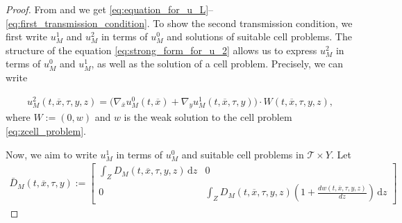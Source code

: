\documentclass[11pt]{article}
\def\T{\mathcal{T}}
\newcommand{\di}[1]{\,\mathrm{d}#1}
\begin{document}
\begin{proof} 
   From  and  we get \eqref{eq:equation_for_u_L}--\eqref{eq:first_transmission_condition}. To show the second transmission condition, we first write $u_M^1$ and $u_M^2$ in terms of $u_M^0$ and solutions of suitable cell problems.
 The structure of the equation \eqref{eq:strong_form_for_u_2} allows us to express $u_M^2$ in terms of $ u_M^0$ and $ u_M^1$, as well as the solution of a cell problem. Precisely, we can write
 
\begin{align*}   u_M^2(t,\overline{x},\tau,y,z)=\Big(\nabla_{\overline{x}}u_M^0(t,\overline{x})+\nabla_y u_M^1(t,\overline{x},\tau,y)\Big)\cdot W(t,\overline{x},\tau,y,z),
\end{align*}
where $W:=(0,w)$ and $w$ is the weak solution to the cell problem \eqref{eq:zcell_problem}.
   
   
   Now, we aim to write $u_M^1$ in terms of $u_M^0$ and suitable cell problems in $\T\times Y$. Let 
 \begin{align}\label{eq:DMbar_structuer2}
        \bar D_M(t,\overline{x},\tau,y):=\begin{bmatrix}
            \int_Z D_M(t,\overline{x},\tau,y,z)\di{z}&0\\
            0&\int_Z D_M(t,\overline{x},\tau,y,z)\left(1+\frac{dw(t,\overline{x},\tau,y,z)}{dz}\right)\di{z}
        \end{bmatrix}
    \end{align}
    

\end{proof}
\end{document}
